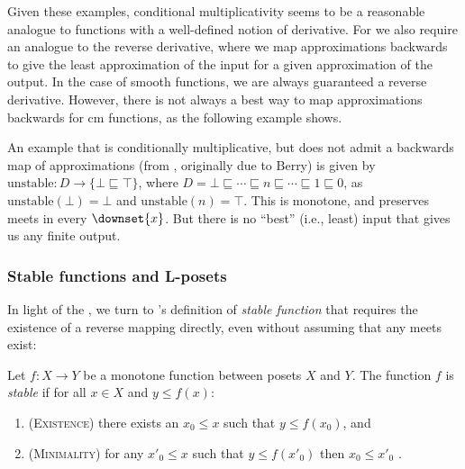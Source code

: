 Given these examples, conditional multiplicativity seems to be a
reasonable analogue to functions with a well-defined notion of
derivative. For \GPS we also require an analogue to the reverse
derivative, where we map approximations backwards to give the least
approximation of the input for a given approximation of the output. In
the case of smooth functions, we are always guaranteed a reverse
derivative. However, there is not always a best way to map
approximations backwards for cm functions, as the following example
shows.

\begin{example}
  \label{ex:non-stable-function}
  An example that is conditionally multiplicative, but does not admit
  a backwards map of approximations (from \citet[just before Lemma
  12.2.3]{amadio-curien}, originally due to Berry) is given by
  $\mathrm{unstable} : D \to \{\bot \sqsubseteq \top\}$, where
  $D = \bot \sqsubseteq \cdots \sqsubseteq n \sqsubseteq \cdots
  \sqsubseteq 1 \sqsubseteq 0$, as $\mathrm{unstable}(\bot) = \bot$
  and $\mathrm{unstable}(n) = \top$. This is monotone, and preserves
  meets in every $\downset{x}$. But there is no ``best'' (i.e., least)
  input that gives us any finite output.
\end{example}

\subsubsection{Stable functions and L-posets}
\label{sec:stab}

In light of the , we turn to
\citet{berry79}'s definition of \emph{stable function} that requires
the existence of a reverse mapping directly, even without assuming
that any meets exist:

\begin{definition}
  Let $f : X \to Y$ be a monotone function between posets $X$ and
  $Y$. The function $f$ is \emph{stable} if for all $x \in X$ and
  $y \leq f(x)$:
  \begin{enumerate}
  \item (\textsc{Existence}) there exists an $x_0 \leq x$ such that $y \leq f(x_0)$, and
  \item (\textsc{Minimality}) for any $x'_0 \leq x$ such that $y \leq f(x'_0)$ then
    $x_0 \leq x'_0$ .
  \end{enumerate}
\end{definition}

